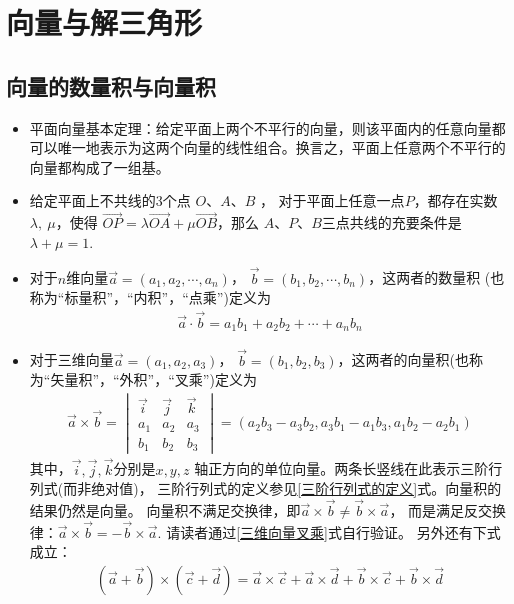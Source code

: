 \chapter{向量与解三角形}

\section{向量的数量积与向量积}
\begin{itemize}[leftmargin=\inteval{\myitemleftmargin}pt,itemsep=
   \inteval{\myitemitempsep}pt,topsep=\inteval{\myitemtopsep}pt]

\item 平面向量基本定理：给定平面上两个不平行的向量，则该平面内的任意向量都可以唯一地表示为这两个向量的线性组合。换言之，平面上任意两个不平行的向量都构成了一组基。

\item 给定平面上不共线的3个点 $ O $、$ A $、$ B $ ，
对于平面上任意一点$ P $，都存在实数$ \lambda,\ \mu $，使得
$ \vec{OP}=\lambda\vec{OA}+\mu\vec{OB} $，那么
$ A $、$ P $、$ B $三点共线的充要条件是$ \lambda+\mu=1 $.

\item 对于$ n $维向量$ \vec{a}=(a_1,a_2,\cdots,a_n) $，
$ \vec{b}=(b_1,b_2,\cdots,b_n) $，这两者的数量积
(也称为“标量积”，“内积”，“点乘”)定义为
\begin{gather*}
    \vec{a}\cdot \vec{b}=a_1b_1+a_2b_2+\cdots+a_nb_n
\end{gather*}

\item 对于三维向量$ \vec{a}=(a_1,a_2,a_3) $，
$ \vec{b}=(b_1,b_2,b_3) $，这两者的向量积(也称为“矢量积”，“外积”，“叉乘”)定义为
\begin{align}\label{三维向量叉乘}
    \vec{a}\times\vec{b} =
    \begin{vmatrix}
        \vec{i} & \vec{j} & \vec{k} \\
        a_1 & a_2 & a_3 \\
        b_1 & b_2 & b_3
    \end{vmatrix}
    =(a_2b_3-a_3b_2,a_3b_1-a_1b_3, a_1b_2-a_2b_1)
\end{align}
其中，$ \vec{i},\vec{j},\vec{k} $分别是$ x,y,z $
轴正方向的单位向量。两条长竖线在此表示三阶行列式(而非绝对值)，
三阶行列式的定义参见\eqref{三阶行列式的定义}式。向量积的结果仍然是向量。
向量积不满足交换律，即$ \vec{a}\times
\vec{b}\neq \vec{b}\times\vec{a} $，
而是满足反交换律：$ \vec{a}\times \vec{b}=-\vec{b}
\times\vec{a} $. 请读者通过\eqref{三维向量叉乘}式自行验证。
另外还有下式成立：
\begin{gather}\label{向量叉乘分配率}
	(\vec{a}+\vec{b})\times (\vec{c}+\vec{d})=\vec{a}\times \vec{c}+
	\vec{a}\times\vec{d}+\vec{b}\times\vec{c}+\vec{b}\times\vec{d}
\end{gather}


\end{itemize}
